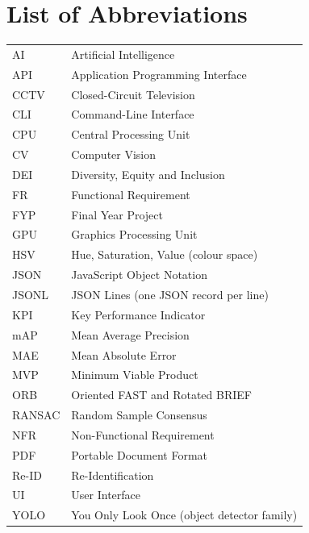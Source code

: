 \chapter*{List of Abbreviations}
\begin{tabular}{P{0.2\textwidth}P{0.7\textwidth}}
AI & Artificial Intelligence\\
API & Application Programming Interface\\
CCTV & Closed-Circuit Television\\
CLI & Command-Line Interface\\
CPU & Central Processing Unit\\
CV & Computer Vision\\
DEI & Diversity, Equity and Inclusion\\
FR & Functional Requirement\\
FYP & Final Year Project\\
GPU & Graphics Processing Unit\\
HSV & Hue, Saturation, Value (colour space)\\
JSON & JavaScript Object Notation\\
JSONL & JSON Lines (one JSON record per line)\\
KPI & Key Performance Indicator\\
mAP & Mean Average Precision\\
MAE & Mean Absolute Error\\
MVP & Minimum Viable Product\\
ORB & Oriented FAST and Rotated BRIEF\\
RANSAC & Random Sample Consensus\\
NFR & Non-Functional Requirement\\
PDF & Portable Document Format\\
Re-ID & Re-Identification\\
UI & User Interface\\
YOLO & You Only Look Once (object detector family)\\
\end{tabular}
